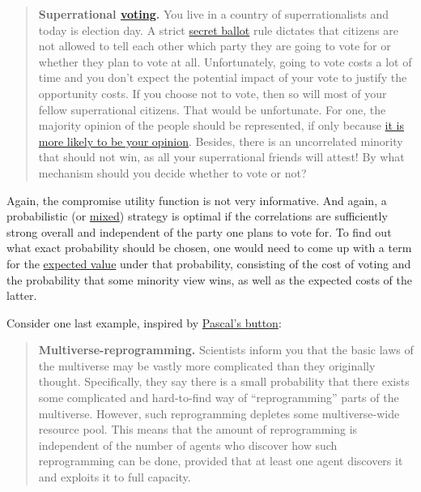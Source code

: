 \begin{quote}
\textbf{Superrational
\href{https://en.wikipedia.org/wiki/Paradox_of_voting}{voting}.}
You live in a country of superrationalists and today is election day. A
strict \href{https://en.wikipedia.org/wiki/Secret_ballot}{secret
ballot} rule dictates that citizens are not allowed to tell each other
which party they are going to vote for or whether they plan to vote at
all. Unfortunately, going to vote costs a lot of time and you don't
expect the potential impact of your vote to justify the opportunity
costs. If you choose not to vote, then so will most of your fellow
superrational citizens. That would be unfortunate. For one, the majority
opinion of the people should be represented, if only because
\href{https://en.wikipedia.org/wiki/Mediocrity_principle}{it is
more likely to be your opinion}. Besides, there is an uncorrelated
minority that should not win, as all your superrational friends will
attest! By what mechanism should you decide whether to vote or not?
\end{quote}

Again, the compromise utility function is not very informative. And
again, a probabilistic (or
\href{https://en.wikipedia.org/wiki/Strategy_(game_theory)\#Pure_and_mixed_strategies}{mixed})
strategy is optimal if the correlations are sufficiently strong overall
and independent of the party one plans to vote for. To find out what
exact probability should be chosen, one would need to come up with a
term for the
\href{https://en.wikipedia.org/wiki/Expected_value}{expected
value} under that probability, consisting of the cost of voting and the
probability that some minority view wins, as well as the expected costs
of the latter.

Consider one last example, inspired by
\href{http://www.sl4.org/archive/0804/18394.html}{Pascal's
button}:

\begin{quote}
\textbf{Multiverse-reprogramming.} Scientists inform you that the basic
laws of the multiverse may be vastly more complicated than they
originally thought. Specifically, they say there is a small probability
that there exists some complicated and hard-to-find way of
``reprogramming'' parts of the multiverse. However, such reprogramming
depletes some multiverse-wide resource pool. This means that the amount
of reprogramming is independent of the number of agents who discover how
such reprogramming can be done, provided that at least one agent
discovers it and exploits it to full capacity.
\end{quote}

